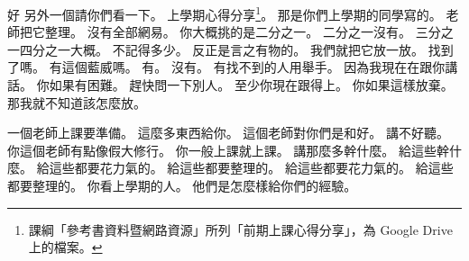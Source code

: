 \hypertarget{c01:cue:484}{}好 另外一個請你們看一下。
\hypertarget{c01:cue:485}{}上學期心得分享\footnote{課綱「參考書資料暨網路資源」所列「前期上課心得分享」，為 Google Drive 上的檔案。}。
\hypertarget{c01:cue:486}{}那是你們上學期的同學寫的。
\hypertarget{c01:cue:487}{}老師把它整理。
\hypertarget{c01:cue:488}{}沒有全部網易。
\hypertarget{c01:cue:489}{}你大概挑的是二分之一。
\hypertarget{c01:cue:490}{}二分之一沒有。
\hypertarget{c01:cue:491}{}三分之一四分之一大概。
\hypertarget{c01:cue:492}{}不記得多少。
\hypertarget{c01:cue:493}{}反正是言之有物的。
\hypertarget{c01:cue:494}{}我們就把它放一放。
\hypertarget{c01:cue:495}{}找到了嗎。
\hypertarget{c01:cue:496}{}有這個藍威嗎。
\hypertarget{c01:cue:497}{}有。
\hypertarget{c01:cue:498}{}沒有。
\hypertarget{c01:cue:499}{}有找不到的人用舉手。
\hypertarget{c01:cue:500}{}因為我現在在跟你講話。
\hypertarget{c01:cue:501}{}你如果有困難。
\hypertarget{c01:cue:502}{}趕快問一下別人。
\hypertarget{c01:cue:503}{}至少你現在跟得上。
\hypertarget{c01:cue:504}{}你如果這樣放棄。
\hypertarget{c01:cue:505}{}那我就不知道該怎麼放。

\hypertarget{c01:cue:506}{}一個老師上課要準備。
\hypertarget{c01:cue:507}{}這麼多東西給你。
\hypertarget{c01:cue:508}{}這個老師對你們是和好。
\hypertarget{c01:cue:509}{}講不好聽。
\hypertarget{c01:cue:510}{}你這個老師有點像假大修行。
\hypertarget{c01:cue:511}{}你一般上課就上課。
\hypertarget{c01:cue:512}{}講那麼多幹什麼。
\hypertarget{c01:cue:513}{}給這些幹什麼。
\hypertarget{c01:cue:514}{}給這些都要花力氣的。
\hypertarget{c01:cue:515}{}給這些都要整理的。
\hypertarget{c01:cue:516}{}給這些都要花力氣的。
\hypertarget{c01:cue:517}{}給這些都要整理的。
\hypertarget{c01:cue:518}{}你看上學期的人。
\hypertarget{c01:cue:519}{}他們是怎麼樣給你們的經驗。

